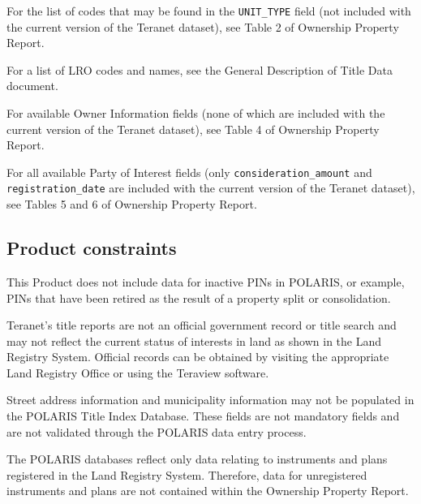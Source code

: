 \documentclass[11pt]{article}
\begin{document}
    \vspace{5mm}

    For the list of codes that may be found in the \texttt{UNIT\_TYPE} field (not included with the current version of the Teranet dataset), see Table 2 of Ownership Property Report\cite{TeranetEnterprisesInc.2011}.

    \vspace{5mm}

    For a list of LRO codes and names, see the General Description of Title Data document.

    \vspace{5mm}

    For available Owner Information fields (none of which are included with the current version of the Teranet dataset), see Table 4 of Ownership Property Report\cite{TeranetEnterprisesInc.2011}.

    \vspace{5mm}

    For all available Party of Interest fields (only \texttt{consideration\_amount} and \texttt{registration\_date} are included with the current version of the Teranet dataset), see Tables 5 and 6 of Ownership Property Report\cite{TeranetEnterprisesInc.2011}.

    \subsection{Product constraints} \label{subsec:teranet_product_constraints}

    This Product does not include data for inactive PINs in POLARIS, or example, PINs that have been retired as the result of a property split or consolidation.

    Teranet's title reports are not an official government record or title search and may not reflect the current status of interests in land as shown in the Land Registry System.
    Official records can be obtained by visiting the appropriate Land Registry Office or using the Teraview software.

    Street address information and municipality information may not be populated in the POLARIS Title Index Database.
    These fields are not mandatory fields and are not validated through the POLARIS data entry process.

    The POLARIS databases reflect only data relating to instruments and plans registered in the Land Registry System.
    Therefore, data for unregistered instruments and plans are not contained within the Ownership Property Report.
\end{document}
